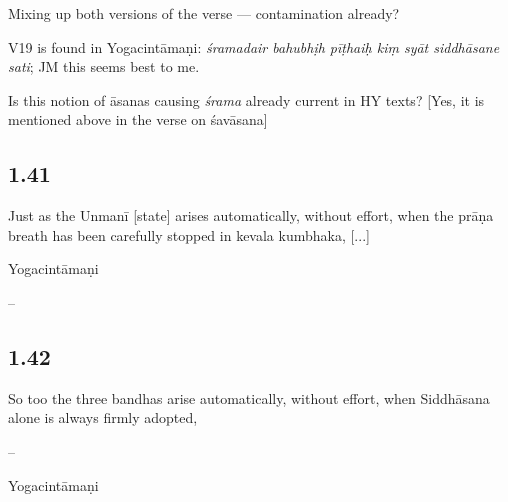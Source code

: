 \begin{ekdosis}
\begin{philcomm}[hp01_040]
Mixing up both versions of the verse — contamination already?

V19 is found in Yogacintāmaṇi: \emph{śramadair bahubhịh pīṭhaiḥ kiṃ syāt siddhāsane sati}; JM this seems best to me.

Is this notion of āsanas causing \emph{śrama} already current in HY texts?
[Yes, it is mentioned above in the verse on śavāsana]
\end{philcomm}


\subsection*{1.41}
\begin{translation}[hp01_041]
Just as the Unmanī [state] arises automatically, without effort, when the prāṇa breath has been carefully stopped in kevala kumbhaka, [...]
\end{translation}

\begin{sources}[hp01_041]
\end{sources}

\begin{testimonia}[hp01_041]
Yogacintāmaṇi

\begin{versinnote}
\end{versinnote}

\end{testimonia}

\begin{philcomm}[hp01_041]
--
\end{philcomm}

\subsection*{1.42}
\begin{translation}[hp01_042]
So too the three bandhas arise automatically, without effort, when Siddhāsana alone is always firmly adopted,
\end{translation}

\begin{sources}[hp01_042]
--
\end{sources}

\begin{testimonia}[hp01_042]
Yogacintāmaṇi


\end{testimonia}
\end{ekdosis}
